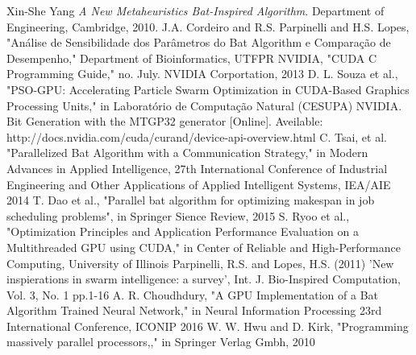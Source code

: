 \documentclass[conference]{IEEEtran}
\begin{document}
\begin{thebibliography}{1} %
    Xin-She Yang \emph{A New Metaheuristics Bat-Inspired Algorithm}. Department of Engineering, Cambridge, 2010.
    J.A. Cordeiro and R.S. Parpinelli and H.S. Lopes, "Análise de Sensibilidade dos Parâmetros do Bat Algorithm e Comparação de Desempenho," Department of Bioinformatics, UTFPR
    NVIDIA, "CUDA C Programming Guide," no. July. NVIDIA Corportation, 2013
    D. L. Souza et al., "PSO-GPU: Accelerating Particle Swarm Optimization in CUDA-Based
    Graphics Processing Units," in Laboratório de Computação Natural
    (CESUPA)
    NVIDIA.  Bit Generation with the MTGP32 generator [Online]. Aveilable: http://docs.nvidia.com/cuda/curand/device-api-overview.html
    C. Tsai, et al. "Parallelized Bat Algorithm with a Communication Strategy," in Modern Advances in Applied Intelligence, 27th International Conference of Industrial Engineering and Other Applications of Applied Intelligent Systems, IEA/AIE 2014
    T. Dao et al.,  "Parallel bat algorithm for optimizing makespan in job scheduling problems", in Springer Sience Review, 2015
    S. Ryoo et al.,  "Optimization Principles and Application Performance Evaluation on a Multithreaded GPU using CUDA," in Center of Reliable and High-Performance Computing, University of Illinois
    Parpinelli, R.S. and Lopes, H.S. (2011) 'New inspierations in swarm intelligence: a survey', Int. J. Bio-Inspired Computation, Vol. 3, No. 1 pp.1-16
    A. R. Choudhdury, "A GPU Implementation of a Bat Algorithm Trained Neural Network," in Neural Information Processing 23rd International Conference, ICONIP 2016
    W. W. Hwu and D. Kirk, "Programming massively parallel processors,," in Springer Verlag Gmbh, 2010
\end{thebibliography}
\end{document}
